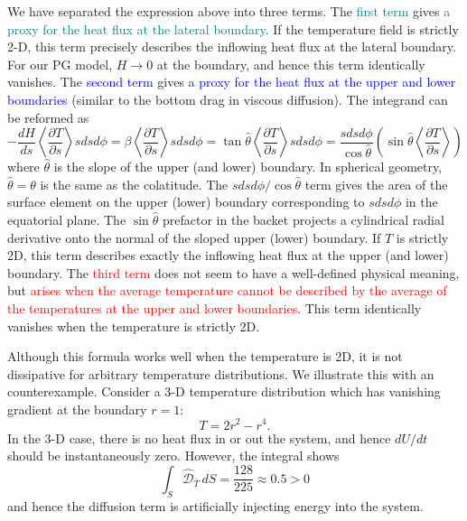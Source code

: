 We have separated the expression above into three terms. The \textcolor{teal}{first term} gives \textcolor{teal}{a proxy for the heat flux at the lateral boundary}. If the temperature field is strictly 2-D, this term precisely describes the inflowing heat flux at the lateral boundary. For our PG model, $H\rightarrow 0$ at the boundary, and hence this term identically vanishes. The \textcolor{blue}{second term} gives \textcolor{blue}{a proxy for the heat flux at the upper and lower boundaries} (similar to the bottom drag in viscous diffusion). The integrand can be reformed as
\[
    - \frac{dH}{ds} \left\langle \frac{\partial T}{\partial s} \right\rangle s ds d\phi = \beta \left\langle \frac{\partial T}{\partial s} \right\rangle s ds d\phi = \tan \hat{\theta} \left\langle \frac{\partial T}{\partial s} \right\rangle s ds d\phi = \frac{s ds d\phi}{\cos\hat{\theta}} \left(\sin\hat{\theta} \left\langle \frac{\partial T}{\partial s} \right\rangle\right)
\]
where $\hat{\theta}$ is the slope of the upper (and lower) boundary. In spherical geometry, $\hat{\theta} = \theta$ is the same as the colatitude. The $s ds d\phi/\cos\hat{\theta}$ term gives the area of the surface element on the upper (lower) boundary corresponding to $sdsd\phi$ in the equatorial plane. The $\sin\hat{\theta}$ prefactor in the backet projects a cylindrical radial derivative onto the normal of the sloped upper (lower) boundary. If $T$ is strictly 2D, this term describes exactly the inflowing heat flux at the upper (and lower) boundary.
The \textcolor{red}{third term} does not seem to have a well-defined physical meaning, but \textcolor{red}{arises when the average temperature cannot be described by the average of the temperatures at the upper and lower boundaries}. This term identically vanishes when the temperature is strictly 2D.

Although this formula works well when the temperature is 2D, it is not dissipative for arbitrary temperature distributions. We illustrate this with an counterexample. Consider a 3-D temperature distribution which has vanishing gradient at the boundary $r=1$:
\[
    T = 2r^2 - r^4.
\]
In the 3-D case, there is no heat flux in or out the system, and hence $dU/dt$ should be instantaneously zero. However, the integral shows
\[
    \int_S \hat{\mathcal{D}}_{\bar{T}} \, dS = \frac{128}{225} \approx 0.5 > 0
\]
and hence the diffusion term is artificially injecting energy into the system.

